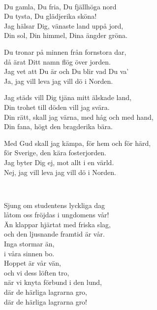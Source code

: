 

 \\
\author{Text: Richard Dybeck}

\songtext{}Du gamla, Du fria, Du fjällhöga nord\\
Du tysta, Du glädjerika sköna!\\
Jag hälsar Dig, vänaste land uppå jord,\\
\leftrepeat Din sol, Din himmel, Dina ängder gröna. \rightrepeat

Du tronar på minnen från fornstora dar,\\
då ärat Ditt namn flög över jorden.\\
Jag vet att Du är och Du blir vad Du va'\\
\leftrepeat Ja, jag vill leva jag vill dö i Norden. \rightrepeat

Jag städs vill Dig tjäna mitt älskade land,\\
Din trohet till döden vill jag svära.\\
Din rätt, skall jag värna, med håg och med hand,\\
\leftrepeat Din fana, högt den bragderika bära. \rightrepeat

Med Gud skall jag kämpa, för hem och för härd,\\
för Sverige, den kära fosterjorden.\\
Jag byter Dig ej, mot allt i en värld.\\
\leftrepeat Nej, jag vill leva jag vill dö i Norden. \rightrepeat


\newpage
 \\
\author{Text: Herman Sätherberg}

\songtext{}Sjung om studentens lyckliga dag\\
låtom oss fröjdas i ungdomens vår!\\
Än klappar hjärtat med friska slag,\\
och den ljusnande framtid är vår.\\
Inga stormar än,\\
i våra sinnen bo.\\
Hoppet är vår vän,\\
och vi dess löften tro,\\
när vi knyta förbund i den lund,\\
där de härliga lagrarna gro,\\
där de härliga lagrarna gro!

